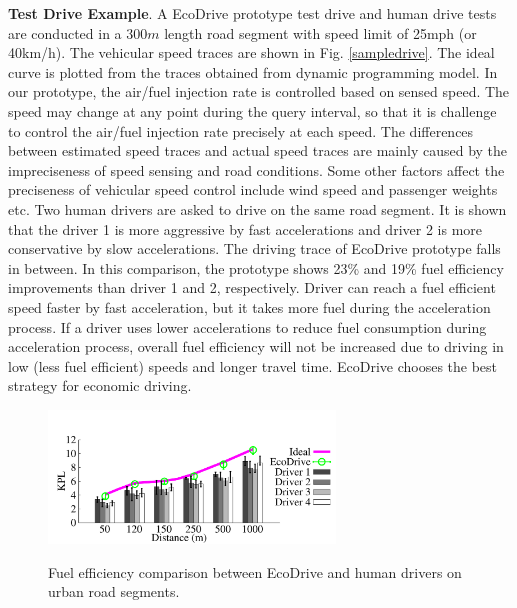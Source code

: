 \textbf{Test Drive Example}. 
A EcoDrive prototype test drive and human drive tests are conducted in a $300m$ length
road segment with speed limit of 25mph (or 40km/h). 
The vehicular speed traces are shown in Fig. \ref{sampledrive}. 
The ideal curve is plotted from the traces obtained from dynamic programming model. 
In our prototype, the air/fuel injection rate is controlled based
on sensed speed. 
The speed may change at any point during the query interval, 
so that it is challenge to control the air/fuel injection rate precisely at each speed. 
The differences between estimated speed traces and
actual speed traces are mainly caused by the impreciseness of 
speed sensing and road conditions.  
Some other factors affect the preciseness of vehicular speed 
control include wind speed and passenger
weights etc. 
Two human drivers are asked to drive 
on the same road segment. 
It is shown that the driver 1 is more aggressive by fast accelerations
and driver 2 is more conservative by slow accelerations. 
The driving trace of EcoDrive prototype falls in between. 
In this comparison, the prototype shows 23\% and 19\% fuel
efficiency improvements than driver 1 and 2, respectively. 
Driver can reach a fuel efficient speed faster by fast acceleration, 
but it takes more fuel during the acceleration process.  
If a driver uses lower accelerations to reduce fuel consumption
during acceleration process, overall fuel efficiency will not be increased due to driving in low (less fuel efficient) speeds
and longer travel time.
EcoDrive chooses the best strategy for economic driving. 




\begin{figure}[t]
\begin{center}
\vspace{-0.5cm}
\includegraphics[width=3.0in,angle=0]{Figs/EcoDrive/evaluation/urbansegments.pdf}
\vspace{-0.0cm}
\caption{Fuel efficiency comparison between EcoDrive and human drivers on urban road segments. }
\vspace{-0.7cm}
\label{urbansegments}
\end{center}
\end{figure}

